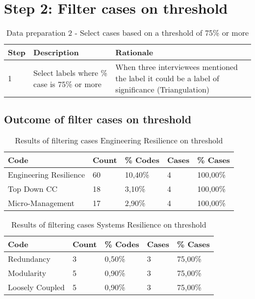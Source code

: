 \section{Step 2: Filter cases on threshold}

\begin{table}[htbp]
	\centering
		\begin{tabular}{p{}p{}p{}}
		\toprule
		\textbf{Step} & \textbf{Description} & \textbf{Rationale} \\
		\midrule
		1     & Select labels where \% case is 75\% or more & When three interviewees mentioned the label it could be a label of significance (Triangulation) \\
		\bottomrule
	\end{tabular}%
	\caption{Data preparation 2 - Select cases based on a threshold of 75\% or more}
	\label{tab:prepselectcases}%
\end{table}%

\subsection{Outcome of filter cases on threshold}

\begin{table}[htbp]
	\centering
	\begin{tabular}{lllll}
		\toprule
		\textbf{Code} & \textbf{Count} & \textbf{\% Codes} &\textbf{Cases} & \textbf{\% Cases} \\
		\midrule
		Engineering Resilience & 60    & 10,40\% & 4     & 100,00\% \\
		Top Down CC & 18    & 3,10\% & 4     & 100,00\% \\
		Micro-Management & 17    & 2,90\% & 4     & 100,00\% \\
		\bottomrule
	\end{tabular}%
	\caption{Results of filtering cases Engineering Resilience on threshold}%
	\label{tab:resultsfilteringengineeringresilience}%
\end{table}%

\begin{table}[htbp]
	\centering
	\begin{tabular}{lllll}
		\toprule
		\textbf{Code} & \textbf{Count} & \textbf{\% Codes} &\textbf{Cases} & \textbf{\% Cases} \\
		\midrule
		Redundancy & 3     & 0,50\% & 3     & 75,00\% \\
		Modularity & 5     & 0,90\% & 3     & 75,00\% \\
		Loosely Coupled & 5     & 0,90\% & 3     & 75,00\% \\
		\bottomrule
	\end{tabular}%
	\caption{Results of filtering cases Systems Resilience on threshold}%
	\label{tab:resultsfilteringsystemsresilience}%
\end{table}%

